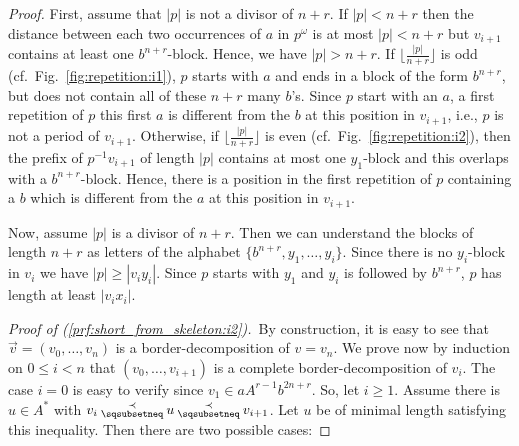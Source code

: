 \begin{appendix}
\begin{proof}
		First, assume that $|p|$ is not a divisor of $n+r$. If $|p|<n+r$ then the distance between each two occurrences of $a$ in $p^\omega$ is at most $|p|<n+r$ but $v_{i+1}$ contains at least one $b^{n+r}$-block. Hence, we have $|p|>n+r$. If $\lfloor\frac{|p|}{n+r}\rfloor$ is odd (cf.\ Fig.~\ref{fig:repetition:i1}), $p$ starts with $a$ and ends in a block of the form $b^{n+r}$, but does not contain all of these $n+r$ many $b$'s. Since $p$ start with an $a$, a first repetition of $p$ this first $a$ is different from the $b$ at this position in $v_{i+1}$, i.e., $p$ is not a period of $v_{i+1}$. Otherwise, if $\lfloor\frac{|p|}{n+r}\rfloor$ is even (cf.\ Fig.~\ref{fig:repetition:i2}), then the prefix of $p^{-1}v_{i+1}$ of length $|p|$ contains at most one $y_1$-block and this overlaps with a $b^{n+r}$-block. Hence, there is a position in the first repetition of $p$ containing a $b$ which is different from the $a$ at this position in $v_{i+1}$.
		
		\begin{figure}[h]
			\begin{subfigure}{\textwidth}
				
			\end{subfigure}
			\begin{subfigure}{\textwidth}
				
			\end{subfigure}
			\caption{\label{fig:repetition}}
		\end{figure}
		
		Now, assume $|p|$ is a divisor of $n+r$. Then we can understand the blocks of length $n+r$ as letters of the alphabet $\{b^{n+r},y_1,\dots,y_i\}$. Since there is no $y_i$-block in $v_i$ we have $|p|\geq|v_iy_i|$. Since $p$ starts with $y_1$ and $y_i$ is followed by $b^{n+r}$, $p$ has length at least $|v_ix_i|$.
		
		\emph{Proof of (\ref{prf:short_from_skeleton:i2}).}\ By construction, it is easy to see that $\vec{v}=(v_0,\dots,v_n)$ is a border-decomposition of $v=v_n$. We prove now by induction on $0\leq i<n$ that $(v_0,\dots,v_{i+1})$ is a complete border-decomposition of $v_i$. The case $i=0$ is easy to verify since $v_1\in aA^{r-1}b^{2n+r}$. So, let $i\geq1$. Assume there is $u\in A^*$ with $v_i\presuf u\presuf v_{i+1}$. Let $u$ be of minimal length satisfying this inequality. Then there are two possible cases:
		

\end{proof}
\end{appendix}
